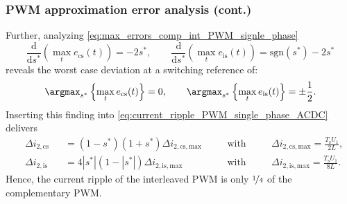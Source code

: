 \begin{frame}
	\frametitle{PWM approximation error analysis (cont.)}
	Further, analyzing \eqref{eq:max_errors_comp_int_PWM_signle_phase}
	\begin{equation}
		\frac{\mathrm{d}}{\mathrm{d}s^*}\left(\max_t e_{\mathrm{cs}}(t)\right) = -2s^*,\qquad
		\frac{\mathrm{d}}{\mathrm{d}s^*}\left(\max_t e_{\mathrm{is}}(t)\right) = \mathrm{sgn}(s^*) -2s^*
	\end{equation}\pause
	reveals the worst case deviation at a switching reference of:
	\begin{equation}
		\argmax_{s^*}\left\{\max_t e_{\mathrm{cs}}(t)\right\} = 0,\qquad
		\argmax_{s^*}\left\{\max_t e_{\mathrm{is}}(t)\right\} = \pm \frac{1}{2}.
	\end{equation}\pause
	Inserting this finding into \eqref{eq:current_ripple_PWM_single_phase_ACDC} delivers
	\begin{equation}
		\begin{alignedat}{4}
			 & \Delta i_{2,\mathrm{cs}} &  & = (1-s^*)(1+s^*) \Delta i_{2,\mathrm{cs}, \mathrm{max}} \quad                        &  & \mbox{with} \quad &  & \Delta i_{2,\mathrm{cs}, \mathrm{max}} = \frac{T_\mathrm{s}U_1}{2L}, \\
			 & \Delta i_{2,\mathrm{is}} &  & = 4\left|s^*\right|(1-\left|s^*\right|) \Delta i_{2,\mathrm{is}, \mathrm{max}} \quad &  & \mbox{with} \quad &  & \Delta i_{2,\mathrm{is}, \mathrm{max}} = \frac{T_\mathrm{s}U_1}{8L}.
		\end{alignedat}
	\end{equation}
	Hence, the current ripple of the interleaved PWM is only $\nicefrac{1}{4}$ of the complementary PWM.
\end{frame}

